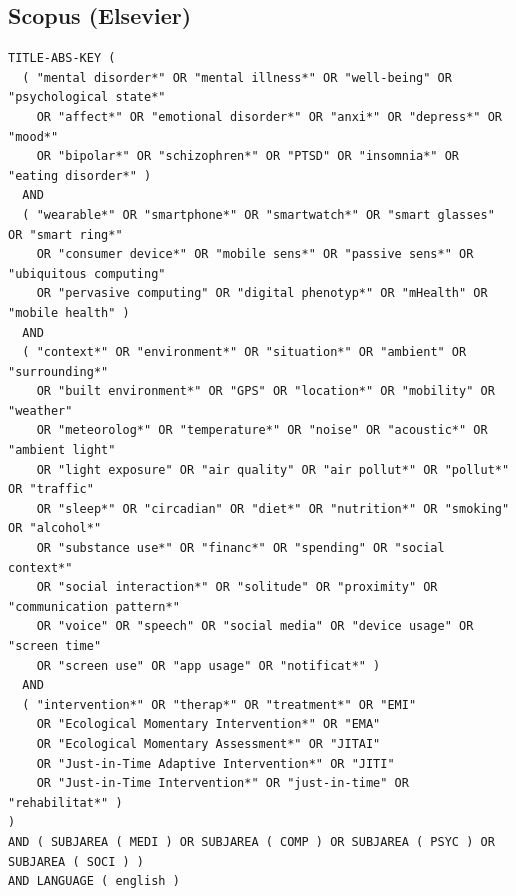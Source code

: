 \subsection{Scopus (Elsevier)}
\begin{lstlisting}[basicstyle=\ttfamily\small, breaklines=true, frame=single]
TITLE-ABS-KEY (
  ( "mental disorder*" OR "mental illness*" OR "well-being" OR "psychological state*" 
    OR "affect*" OR "emotional disorder*" OR "anxi*" OR "depress*" OR "mood*" 
    OR "bipolar*" OR "schizophren*" OR "PTSD" OR "insomnia*" OR "eating disorder*" )
  AND 
  ( "wearable*" OR "smartphone*" OR "smartwatch*" OR "smart glasses" OR "smart ring*" 
    OR "consumer device*" OR "mobile sens*" OR "passive sens*" OR "ubiquitous computing" 
    OR "pervasive computing" OR "digital phenotyp*" OR "mHealth" OR "mobile health" )
  AND 
  ( "context*" OR "environment*" OR "situation*" OR "ambient" OR "surrounding*" 
    OR "built environment*" OR "GPS" OR "location*" OR "mobility" OR "weather" 
    OR "meteorolog*" OR "temperature*" OR "noise" OR "acoustic*" OR "ambient light" 
    OR "light exposure" OR "air quality" OR "air pollut*" OR "pollut*" OR "traffic" 
    OR "sleep*" OR "circadian" OR "diet*" OR "nutrition*" OR "smoking" OR "alcohol*" 
    OR "substance use*" OR "financ*" OR "spending" OR "social context*" 
    OR "social interaction*" OR "solitude" OR "proximity" OR "communication pattern*" 
    OR "voice" OR "speech" OR "social media" OR "device usage" OR "screen time" 
    OR "screen use" OR "app usage" OR "notificat*" )
  AND 
  ( "intervention*" OR "therap*" OR "treatment*" OR "EMI" 
    OR "Ecological Momentary Intervention*" OR "EMA" 
    OR "Ecological Momentary Assessment*" OR "JITAI" 
    OR "Just-in-Time Adaptive Intervention*" OR "JITI" 
    OR "Just-in-Time Intervention*" OR "just-in-time" OR "rehabilitat*" )
) 
AND ( SUBJAREA ( MEDI ) OR SUBJAREA ( COMP ) OR SUBJAREA ( PSYC ) OR SUBJAREA ( SOCI ) ) 
AND LANGUAGE ( english )
\end{lstlisting}


